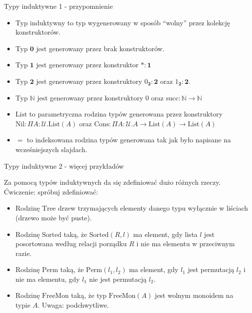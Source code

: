 \documentclass{beamer}
\newcommand{\U}{\mathcal{U}}
\begin{document}
\begin{frame}{Typy induktywne 1 - przypomnienie}
\begin{itemize}
	\item Typ induktywny to typ wygenerowany w sposób ``wolny'' przez kolekcję konstruktorów.
	\item Typ $\textbf{0}$ jest generowany przez brak konstruktorów.
	\item Typ $\textbf{1}$ jest generowany przez konstruktor $* : \textbf{1}$
	\item Typ $\textbf{2}$ jest generowany przez konstruktory $0_{\textbf{2}} : \textbf{2}$ oraz $1_{\textbf{2}} : \textbf{2}$.
	\item Typ $\mathbb{N}$ jest generowany przez konstruktory $0$ oraz $\text{succ} : \mathbb{N} \to \mathbb{N}$
	\item $\text{List}$ to parametryczna rodzina typów generowana przez konstruktory $\text{Nil} : \Pi A : \U. \text{List}(A)$ oraz $\text{Cons} : \Pi A : \U. A \to \text{List}(A) \to \text{List}(A)$
	\item $=$ to indeksowana rodzina typów generowana tak jak było napisane na wcześniejszych slajdach.
\end{itemize}
\end{frame}

\begin{frame}{Typy induktywne 2 - więcej przykładów}

Za pomocą typów induktywnych da się zdefiniować dużo różnych rzeczy. Ćwiczenie: spróbuj zdefiniować:
\begin{itemize}
	\item Rodzinę $\text{Tree}$ drzew trzymających elementy danego typu wyłącznie w liściach (drzewo może być puste).
	\item Rodzinę $\text{Sorted}$ taką, że $\text{Sorted}(R, l)$ ma element, gdy lista $l$ jest posortowana według relacji porządku $R$ i nie ma elementu w przeciwnym razie.
	\item Rodzinę $\text{Perm}$ taką, że $\text{Perm}(l_1, l_2)$ ma element, gdy $l_1$ jest permutacją $l_2$ i nie ma elementu, gdy $l_1$ nie jest permutacją $l_2$.
	\item Rodzinę $\text{FreeMon}$ taką, że typ $\text{FreeMon}(A)$ jest wolnym monoidem na typie $A$. Uwaga: podchwytliwe.
\end{itemize}
\end{frame}
\end{document}
